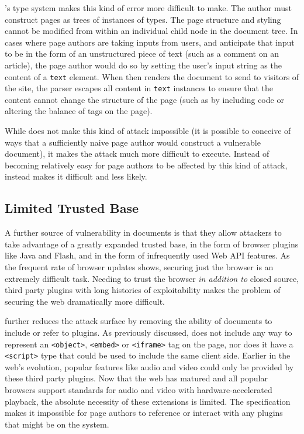 \CDF's type system makes this kind of error more difficult to make.  The \CDF
author must construct pages as trees of instances of types.  The page
structure and styling cannot be modified from within an individual child node
in the document tree. In cases where page authors are taking inputs from users,
and anticipate that input to be in the form of an unstructured piece of text
(such as a comment on an article), the page author would do so by setting the
user's input string as the content of a \texttt{text} element.  When \CDF then
renders the document to send to visitors of the site, the \CDF parser escapes
all content in \texttt{text} instances to ensure that the content cannot change
the structure of the page (such as by including \JS code or altering the
balance of tags on the page).

While \CDF does not make this kind of attack impossible (it is possible to
conceive of ways that a sufficiently naive page author would construct a
vulnerable document), it makes the attack much more difficult to execute.
Instead of becoming relatively easy for page authors to be affected by this
kind of attack, \CDF instead makes it difficult and less likely.


\subsection{Limited Trusted Base}
A further source of vulnerability in \HTML documents is that they allow
attackers to take advantage of a greatly expanded trusted base, in the form of
browser plugins like Java and Flash, and in the form of infrequently used Web
API features.  As the frequent rate of browser updates shows, securing just the
browser is an extremely difficult task.  Needing to trust the browser \emph{in
addition to} closed source, third party plugins with long histories of
exploitability makes the problem of securing the web dramatically more
difficult.

\CDF further reduces the attack surface by removing the ability of \CDF
documents to include or refer to plugins. As previously discussed, \CDF does
not include any way to represent an \texttt{<object>}, \texttt{<embed>} or
\texttt{<iframe>} tag on the page, nor does it have a \texttt{<script>} type
that could be used to include the same client side. Earlier in the web's
evolution, popular features like audio and video could only be provided by
these third party plugins. Now that the web has matured and all popular
browsers support standards for audio and video with hardware-accelerated
playback, the absolute necessity of these extensions is limited. The \CDF
specification makes it impossible for \CDF page authors to reference or
interact with any plugins that might be on the system.


